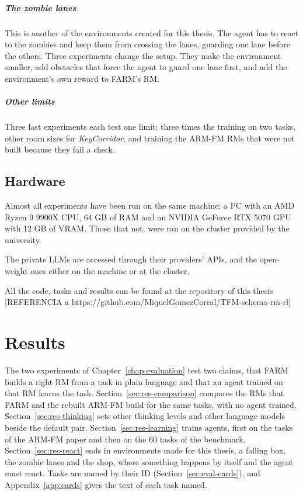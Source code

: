 \documentclass[11pt,english,listoffigures,listoftables]{tfgetsinf}
\newcommand{\env}[1]{\textsf{\slshape #1}}  %
\begin{document}
\paragraph{The zombie lanes} This is another of the environments created for this thesis. The agent has to react to the zombies and keep them from crossing the lanes, guarding one lane before the others. Three experiments change the setup. They make the environment smaller, add obstacles that force the agent to guard one lane first, and add the environment's own reward to FARM's RM.

\paragraph{Other limits} Three last experiments each test one limit: three times the training on two tasks, other room sizes for \env{KeyCorridor}, and training the ARM-FM RMs that were not built because they fail a check.

\section{Hardware}
Almost all experiments have been run on the same machine: a PC with an AMD Ryzen 9 9900X CPU, 64 GB of RAM and an NVIDIA GeForce RTX 5070 GPU with 12 GB of VRAM. Those that not, were ran on the cluster provided by the university. 

The private LLMs are accessed through their providers' APIs, and the open-weight ones either on the machine or at the cluster. 

All the code, tasks and results can be found at the repository of this thesis [REFERENCIA a https://github.com/MiquelGomezCorral/TFM-schema-rm-rl]


\chapter{Results}
\label{chap:results}

The two experiments of Chapter~\ref{chap:evaluation} test two claims, that FARM builds a right RM from a task in plain language and that an agent trained on that RM learns the task. Section~\ref{sec:res-comparison} compares the RMs that FARM and the rebuilt ARM-FM build for the same tasks, with no agent trained. Section~\ref{sec:res-thinking} sets other thinking levels and other language models beside the default pair. Section~\ref{sec:res-learning} trains agents, first on the tasks of the ARM-FM paper and then on the 60 tasks of the benchmark. Section~\ref{sec:res-react} ends in environments made for this thesis, a falling box, the zombie lanes and the shop, where something happens by itself and the agent must react. Tasks are named by their ID (Section~\ref{sec:eval-cards}), and Appendix~\ref{app:cards} gives the text of each task named.
\end{document}
